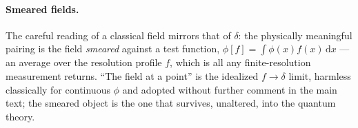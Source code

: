 \documentclass[11pt]{article}
\theoremstyle{plain}
\theoremstyle{definition}
\theoremstyle{remark}
\newcommand{\dd}{\mathrm{d}}
\begin{document}
\paragraph{Smeared fields.} The careful reading of a classical field
mirrors that of $\delta$: the physically meaningful
pairing is the field \emph{smeared} against a test function,
$\phi[f] = \int \phi(x) f(x)\,\dd x$ --- an average over the
resolution profile $f$, which is all any finite-resolution
measurement returns. ``The field at a point'' is the idealized
$f \to \delta$ limit, harmless classically for continuous $\phi$ and
adopted without further comment in the main text; the smeared object
is the one that survives, unaltered, into the quantum theory.
\end{document}
